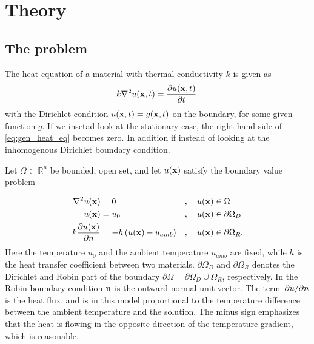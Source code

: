 \section{Theory}
\subsection{The problem}
The heat equation of a material with thermal conductivity $k$ is given as
\begin{equation}
	k\laplacian{u(\vb{x},t)} = \pdv{u(\vb{x},t)}{t}
	\label{eq:gen_heat_eq},
\end{equation}
with the Dirichlet condition $u(\vb{x},t) = g(\vb{x},t)$ on the boundary, for some given function $g$. If we insetad look at the stationary case, the right hand side of \eqref{eq:gen_heat_eq} becomes zero. In addition if instead of looking at the inhomogenous Dirichlet boundary condition.

Let $\Omega \subset \mathbb{R}^n$ be bounded, open set, and let $u(\vb{x})$ satisfy the boundary value problem 

\begin{alignat}{3}
	\laplacian{u(\vb{x})} &= 0 &&,\quad u(\vb{x}) \in \Omega \\
	u(\vb{x}) &= u_0 &&,\quad u(\vb{x}) \in \partial\Omega_D \\
	k\pdv{u(\vb{x})}{n} &= -h\left(u(\vb{x}) - u_{amb} \right) &&, \quad u(\vb{x}) \in \partial\Omega_R.
	\label{eq:heat_bvp}
\end{alignat}
Here the temperature $u_0$ and the ambient temperature $u_{amb}$ are fixed, while $h$ is the heat transfer coefficient between two materials. $\partial\Omega_D$ and $\partial\Omega_R$ denotes the Dirichlet and Robin part of the boundary $\partial\Omega = \partial\Omega_D\cup\Omega_R$, respectively. In the Robin boundary condition  $\vb{n}$ is the outward normal unit vector. The term $\pdv*{u}{n}$ is the heat flux, and is in this model proportional to the temperature difference between the ambient temperature and the solution. The minus sign emphasizes that the heat is flowing in the opposite direction of the temperature gradient, which is reasonable.

